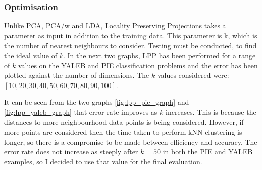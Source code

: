 \documentclass[12pt]{article} %
\begin{document}
\subsubsection{Optimisation}
Unlike PCA, PCA/w and LDA, Locality Preserving Projections takes a parameter as input in addition to the training data. This parameter is k, which is the number of nearest neighbours to consider. Testing must be conducted, to find the ideal value of \(k\). In the next two graphs, LPP has been performed for a range of \(k\) values on the YALEB and PIE classification problems and the error has been plotted against the number of dimensions. The \(k\) values considered were: \([10, 20, 30, 40, 50, 60, 70, 80, 90, 100]\).

It can be seen from the two graphs \ref{fig:lpp_pie_graph} and \ref{fig:lpp_yaleb_graph} that error rate improves as \(k\) increases. This is because the distances to more neighbourhood data points is being considered. However, if more points are considered then the time taken to perform kNN clustering is longer, so there is a compromise to be made between efficiency and accuracy. The error rate does not increase as steeply after \(k = 50\) in both the PIE and YALEB examples, so I decided to use that value for the final evaluation.
\end{document}
